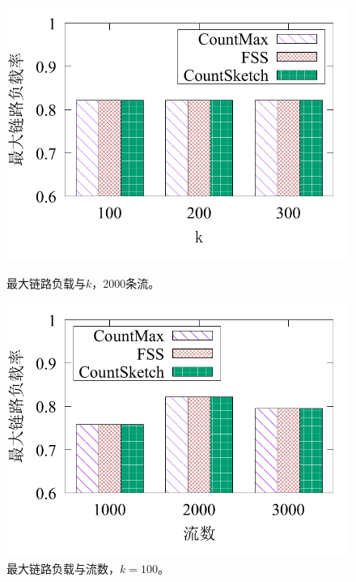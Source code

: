 \begin{figure}[!t]
	\centering
	\begin{minipage}[t]{0.48\linewidth}		
		\centering
		\includegraphics[width=\linewidth]{fig/proto_k_load_2000.pdf}
		\caption{\textnormal{最大链路负载与$k$，2000条流。}}
		\label{fig:prototype,load,k}
	\end{minipage}\vspace{-0.6em}\hspace{0.4em}
	\begin{minipage}[t]{0.48\linewidth}
		\centering
		\includegraphics[width=\linewidth]{fig/proto_flow_load_200.pdf}
		\caption{\textnormal{最大链路负载与流数，$k=100$。}}
		\label{fig:prototype,load,flow}
	\end{minipage}\vspace{-0.6em}
\end{figure}


